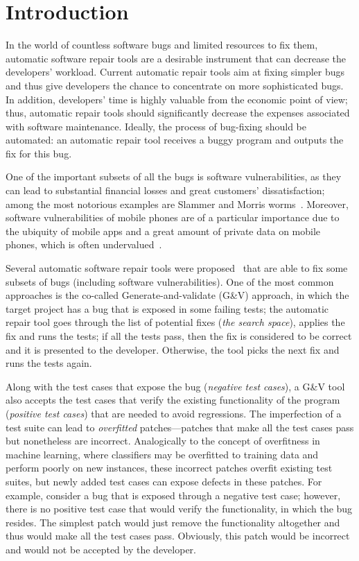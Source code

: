 \section{Introduction}

In the world of countless software bugs and limited resources to fix them, automatic software repair tools are a desirable instrument that can decrease the developers' workload.
Current automatic repair tools aim at fixing simpler bugs and thus give developers the chance to concentrate on more sophisticated bugs.
In addition, developers' time is highly valuable from the economic point of view; thus, automatic repair tools should significantly decrease the expenses  associated with software maintenance.
Ideally, the process of bug-fixing should be automated: an automatic repair tool receives a buggy program and outputs the fix for this bug.

One of the important subsets of all the bugs is software vulnerabilities, as they can lead to substantial financial losses and great customers' dissatisfaction; among the most notorious examples are Slammer and Morris worms~\cite{moore2003inside, streak2003morris}.
Moreover, software vulnerabilities of mobile phones are of a particular importance due to the ubiquity of mobile apps and a great amount of private data on mobile phones, which is often undervalued~\cite{egelman2014you}.

Several automatic software repair tools were proposed~\cite{le2012systematic, long2015staged, mechtaev2016angelix} that are able to fix some subsets of bugs (including software vulnerabilities).
One of the most common approaches is the co-called Generate-and-validate (G\&V) approach, in which the target project has a bug that is exposed in some failing tests; the automatic repair tool goes through the list of potential fixes (\emph{the search space}), applies the fix and runs the tests; if all the tests pass, then the fix is considered to be correct and it is presented to the developer.
Otherwise, the tool picks the next fix and runs the tests again.

Along with the test cases that expose the bug (\emph{negative test cases}), a G\&V tool also accepts the test cases that verify the existing functionality of the program (\emph{positive test cases}) that are needed to avoid regressions.
The imperfection of a test suite can lead to \emph{overfitted} patches---patches that make all the test cases pass but nonetheless are incorrect.
Analogically to the concept of overfitness in machine learning, where classifiers may be overfitted to training data and perform poorly on new instances, these incorrect patches overfit existing test suites, but newly added test cases can expose defects in these patches.
For example, consider a bug that is exposed through a negative test case; however, there is no positive test case that would verify the functionality, in which the bug resides.
The simplest patch would just remove the functionality altogether and thus would make all the test cases pass.
Obviously, this patch would be incorrect and would not be accepted by the developer.

